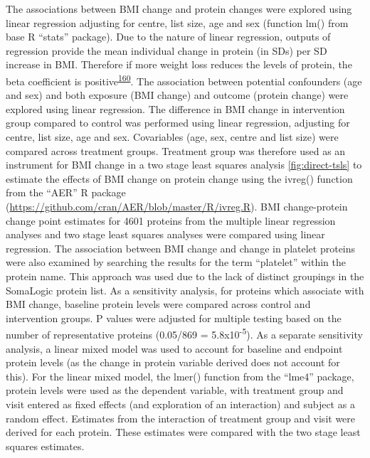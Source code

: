 \documentclass[11pt,twoside]{bristolthesis}
\begin{document}
The associations between BMI change and protein changes were explored using linear regression adjusting for centre, list size, age and sex (function lm() from base R ``stats'' package). Due to the nature of linear regression, outputs of regression provide the mean individual change in protein (in SDs) per SD increase in BMI. Therefore if more weight loss reduces the levels of protein, the beta coefficient is positive\textsuperscript{\protect\hyperlink{ref-Figarska2020}{160}}. The association between potential confounders (age and sex) and both exposure (BMI change) and outcome (protein change) were explored using linear regression. The difference in BMI change in intervention group compared to control was performed using linear regression, adjusting for centre, list size, age and sex. Covariables (age, sex, centre and list size) were compared across treatment groups. Treatment group was therefore used as an instrument for BMI change in a two stage least squares analysis \ref{fig:direct-tsls} to estimate the effects of BMI change on protein change using the ivreg() function from the ``AER'' R package (\url{https://github.com/cran/AER/blob/master/R/ivreg.R}). BMI change-protein change point estimates for 4601 proteins from the multiple linear regression analyses and two stage least squares analyses were compared using linear regression. The association between BMI change and change in platelet proteins were also examined by searching the results for the term ``platelet'' within the protein name. This approach was used due to the lack of distinct groupings in the SomaLogic protein list. As a sensitivity analysis, for proteins which associate with BMI change, baseline protein levels were compared across control and intervention groups. P values were adjusted for multiple testing based on the number of representative proteins (0.05/869 = 5.8x10\textsuperscript{-5}). As a separate sensitivity analysis, a linear mixed model was used to account for baseline and endpoint protein levels (as the change in protein variable derived does not account for this). For the linear mixed model, the lmer() function from the ``lme4'' package, protein levels were used as the dependent variable, with treatment group and visit entered as fixed effects (and exploration of an interaction) and subject as a random effect. Estimates from the interaction of treatment group and visit were derived for each protein. These estimates were compared with the two stage least squares estimates.
\end{document}
